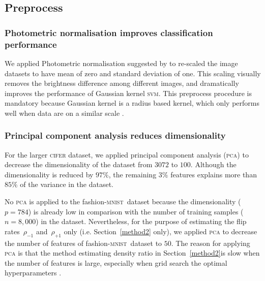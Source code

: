\documentclass[12pt]{article} %
\newcommand{\svm}{\textsc{svm}}
\newcommand{\rhoo}{\rho_{+1}}
\newcommand{\rhoz}{\rho_{-1}}
\newcommand{\mnist}{fashion-\textsc{mnist}}
\begin{document}
\subsection{Preprocess}\label{preproc}
\subsubsection{Photometric normalisation improves classification performance}
We applied Photometric normalisation suggested by \citet{jonsson2002support} to re-scaled the image datasets to have mean of zero and standard deviation of one. This scaling visually removes the brightness difference among different images, and dramatically improves the performance of Gaussian kernel \svm . This preprocess procedure is mandatory because Gaussian kernel is a radius based kernel, which only performs well when data are on a similar scale \citep{jonsson2002support}.

\subsubsection{Principal component analysis reduces dimensionality}
For the larger \textsc{cifer} dataset, we applied principal component analysis (\textsc{pca}) to decrease the dimensionality of the dataset from $3072$ to $100$. Although the dimensionality is reduced by $97\%$, the remaining $3\%$ features explains more than $85\%$ of the variance in the dataset.

No \textsc{pca} is applied to the \mnist\ dataset because the dimensionality ($p=784$) is already low in comparison with the number of training samples ($n=8,000$) in the dataset. Nevertheless, for the purpose of estimating the flip rates~$\rhoz$ and~$\rhoo$ only (i.e. Section~\ref{method2} only), we applied \textsc{pca} to decrease the number of features of \mnist\ dataset to $50$. The reason for applying \textsc{pca} is that the method estimating density ratio in Section~\ref{method2}is slow when the number of features is large, especially when grid search the optimal hyperparameters .
\end{document}
